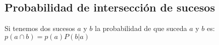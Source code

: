 \subsection{Probabilidad de intersección de sucesos}
Si tenemos dos sucesos $a$ y $b$ la probabilidad de que suceda $a$ y $b$ es:
$p(a\cap b)=p(a)P(b|a)$\\
